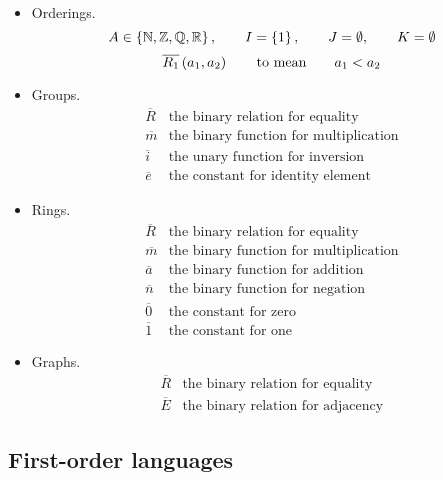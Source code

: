 \pagebreak

\begin{example1}
\label{eg:2.1.3}
\hfill
\begin{itemize}
\item Orderings.
$$ A \in \left\{ \mathbb{N}, \mathbb{Z}, \mathbb{Q}, \mathbb{R} \right\}, \qquad I = \left\{ 1 \right\}, \qquad J = \emptyset, \qquad K = \emptyset $$
$$ \overline{R_1}\left( a_1, a_2 \right) \qquad \text{to mean} \qquad a_1 < a_2 $$
\item Groups.
$$
\begin{array}{ll}
\overline{R} & \text{the binary relation for equality} \\
\overline{m} & \text{the binary function for multiplication} \\
\overline{i} & \text{the unary function for inversion} \\
\overline{e} & \text{the constant for identity element}
\end{array}
$$
\item Rings.
$$
\begin{array}{ll}
\overline{R} & \text{the binary relation for equality} \\
\overline{m} & \text{the binary function for multiplication} \\
\overline{a} & \text{the binary function for addition} \\
\overline{n} & \text{the binary function for negation} \\
\overline{0} & \text{the constant for zero} \\
\overline{1} & \text{the constant for one}
\end{array}
$$
\item Graphs.
$$
\begin{array}{ll}
\overline{R} & \text{the binary relation for equality} \\
\overline{E} & \text{the binary relation for adjacency}
\end{array}
$$
\end{itemize}
\end{example1}

\subsection{First-order languages}

